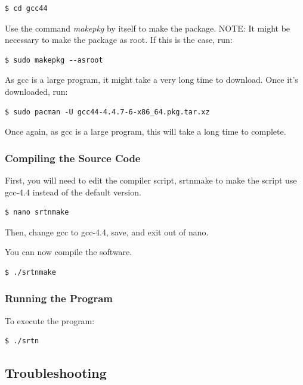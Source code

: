 \documentclass[11pt]{article} %
\begin{document}
\begin{lstlisting}[frame=single]
$ cd gcc44
\end{lstlisting}

Use the command \emph{makepkg} by itself to make the package. NOTE: It might be necessary to make the package as root. If this is the case, run:

\begin{lstlisting}[frame=single]
$ sudo makepkg --asroot
\end{lstlisting}

As gcc is a large program, it might take a very long time to download. Once it's downloaded, run:

\begin{lstlisting}[frame=single]
$ sudo pacman -U gcc44-4.4.7-6-x86_64.pkg.tar.xz
\end{lstlisting}

Once again, as gcc is a large program, this will take a long time to complete.
\vspace{1cm}
\subsubsection{Compiling the Source Code}

First, you will need to edit the compiler script, srtnmake to make the script use gcc-4.4 instead of the default version.

\begin{lstlisting}[frame=single]
$ nano srtnmake
\end{lstlisting}

Then, change gcc to gcc-4.4, save, and exit out of nano.

You can now compile the software.

\begin{lstlisting}[frame=single]
$ ./srtnmake
\end{lstlisting}
\vspace{1cm}
\subsubsection{Running the Program}
To execute the program:

\begin{lstlisting}[frame=single]
$ ./srtn
\end{lstlisting}


\vspace{1cm}
\subsection{Troubleshooting}
\end{document}
